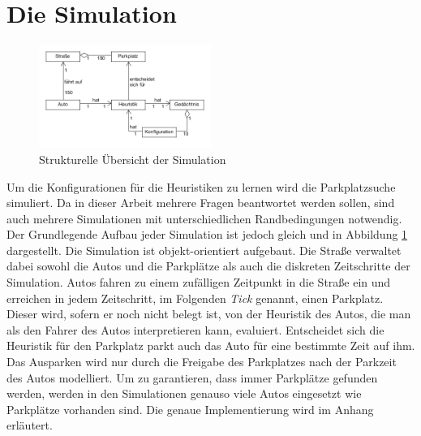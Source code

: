 \section{Die Simulation}
\begin{figure}
\includegraphics[width=0.5\textwidth]{uml/simOverview.png}
\caption{Strukturelle Übersicht der Simulation}\label{fig_simOver}
\end{figure}
Um die Konfigurationen für die Heuristiken zu lernen wird die Parkplatzsuche simuliert. Da in dieser Arbeit mehrere Fragen beantwortet werden sollen, sind auch mehrere Simulationen mit unterschiedlichen Randbedingungen notwendig. Der Grundlegende Aufbau jeder Simulation ist jedoch gleich und in Abbildung \ref{fig_simOver} dargestellt. Die Simulation ist objekt-orientiert aufgebaut. Die Straße verwaltet dabei sowohl die Autos und die Parkplätze als auch die diskreten Zeitschritte der Simulation. Autos fahren zu einem zufälligen Zeitpunkt in die Straße ein und erreichen in jedem Zeitschritt, im Folgenden \emph{Tick} genannt, einen Parkplatz. Dieser wird, sofern er noch nicht belegt ist, von der Heuristik des Autos, die man als den Fahrer des Autos interpretieren kann, evaluiert. Entscheidet sich die Heuristik für den Parkplatz parkt auch das Auto für eine bestimmte Zeit auf ihm. Das Ausparken wird nur durch die Freigabe des Parkplatzes nach der Parkzeit des Autos modelliert. Um zu garantieren, dass immer Parkplätze gefunden werden, werden in den Simulationen genauso viele Autos eingesetzt wie Parkplätze vorhanden sind. Die genaue Implementierung wird im Anhang erläutert.


